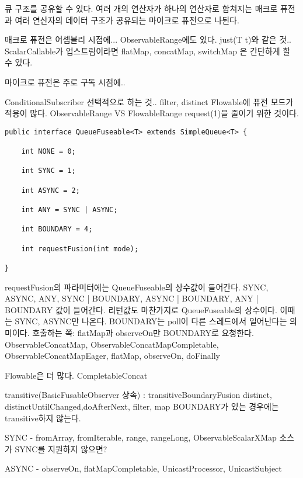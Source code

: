 \documentclass{book}
\begin{document}
큐 구조를 공유할 수 있다.
여러 개의 연산자가 하나의 연산자로 합쳐지는 매크로 퓨전과 여러 연산자의 데이터 구조가 공유되는 마이크로 퓨전으로 나뒨다.

매크로 퓨전은 어셈블리 시점에...
ObservableRange에도 있다.
just(T t)와 같은 것..
ScalarCallable가 업스트림이라면 flatMap, concatMap, switchMap 은 간단하게 할 수 있다.

마이크로 퓨전은 주로 구독 시점에..

ConditionalSubscriber 선택적으로 하는 것..
filter, distinct
Flowable에 퓨전 모드가 적용이 많다.
ObservableRange VS FlowableRange
request(1)을 줄이기 위한 것이다.

\begin{verbatim}
public interface QueueFuseable<T> extends SimpleQueue<T> {

    int NONE = 0;

    int SYNC = 1;

    int ASYNC = 2;

    int ANY = SYNC | ASYNC;

    int BOUNDARY = 4;

    int requestFusion(int mode);
    
}    
\end{verbatim}

requestFusion의 파라미터에는 QueueFuseable의 상수값이 들어간다.
SYNC, ASYNC, ANY, SYNC | BOUNDARY, ASYNC | BOUNDARY, ANY | BOUNDARY 값이 들어간다.
리턴값도 마찬가지로 QueueFuseable의 상수이다. 이때는 SYNC, ASYNC만 나온다.
BOUNDARY는 poll이 다른 스레드에서 일어난다는 의미이다. 
호출하는 쪽:
flatMap과 observeOn만 BOUNDARY로 요청한다.
ObservableConcatMap, ObservableConcatMapCompletable, ObservableConcatMapEager,
flatMap, observeOn, doFinally

Flowable은 더 많다.
CompletableConcat

transitive(BasicFusableObserver 상속) : transitiveBoundaryFusion
distinct, distinctUntilChanged,doAfterNext, filter, map
BOUNDARY가 있는 경우에는 transitive하지 않는다.



SYNC - fromArray, fromIterable, range, rangeLong, ObservableScalarXMap
소스가 SYNC를 지원하지 않으면?

ASYNC - observeOn, flatMapCompletable, UnicastProcessor, UnicastSubject
\end{document}
